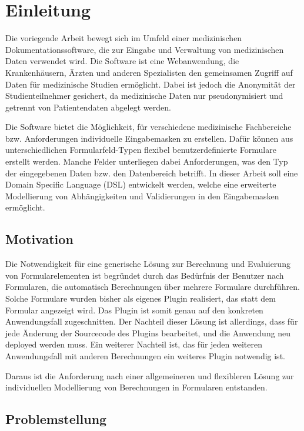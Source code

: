 \chapter{Einleitung}

Die voriegende Arbeit bewegt sich im Umfeld einer medizinischen Dokumentationssoftware, die zur Eingabe und
Verwaltung von medizinischen Daten verwendet wird. Die Software ist eine Webanwendung, die
Krankenhäusern, Ärzten und anderen Spezialisten den gemeinsamen Zugriff auf Daten für medizinische
Studien ermöglicht. Dabei ist jedoch die Anonymität der Studienteilnehmer gesichert, da medizinische Daten
nur pseudonymisiert und getrennt von Patientendaten abgelegt werden.

Die Software bietet die Möglichkeit, für verschiedene medizinische Fachbereiche bzw. Anforderungen
individuelle Eingabemasken zu erstellen. Dafür können aus unterschiedlichen Formularfeld-Typen flexibel
benutzerdefinierte Formulare erstellt werden. Manche Felder unterliegen dabei Anforderungen, was den Typ
der eingegebenen Daten bzw. den Datenbereich betrifft. In dieser Arbeit soll eine Domain Specific Language (DSL) entwickelt werden, 
welche eine erweiterte Modellierung von Abhängigkeiten und Validierungen in den Eingabemasken ermöglicht.


\section{Motivation}

Die Notwendigkeit für eine generische Lösung zur Berechnung und Evaluierung von Formularelementen
ist begründet durch das Bedürfnis der Benutzer nach Formularen, die automatisch Berechnungen über
mehrere Formulare durchführen. Solche Formulare wurden bisher als eigenes Plugin realisiert, das statt dem Formular 
angezeigt wird. Das Plugin ist somit genau auf den konkreten Anwendungsfall zugeschnitten. Der Nachteil dieser
Lösung ist allerdings, dass für jede Änderung der Sourcecode des Plugins bearbeitet, und die Anwendung 
neu deployed werden muss. Ein weiterer Nachteil ist, das für jeden weiteren Anwendungsfall mit anderen Berechnungen
ein weiteres Plugin notwendig ist.

Daraus ist die Anforderung nach einer allgemeineren und flexibleren Lösung zur individuellen Modellierung von 
Berechnungen in Formularen entstanden.


\section{Problemstellung}

